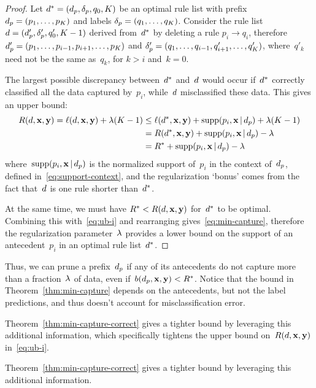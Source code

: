 \begin{arxiv}
\begin{proof}
Let ${d^* = (d_p, \delta_p, q_0, K)}$ be an optimal
rule list with prefix ${d_p = (p_1, \dots, p_K)}$
and labels ${\delta_p = (q_1, \dots, q_K)}$.
%
Consider the rule list ${{d} = (d_p', \delta_p', q_0', K-1)}$
derived from~$d^*$ by deleting a rule ${p_i \rightarrow q_i}$,
therefore ${d_p' = (p_1, \dots, p_{i-1}, p_{i+1}, \dots, p_K)}$
and ${\delta_p' = (q_1, \dots, q_{i-1}, q'_{i+1}, \dots, q'_K)}$,
where~$q'_k$ need not be the same as~$q_k$, for ${k > i}$ and~${k = 0}$.

The largest possible discrepancy between~$d^*$ and~${d}$ would occur
if~$d^*$ correctly classified all the data captured by~$p_i$,
while~${d}$ misclassified these data.
%
This gives an upper bound:
\begin{align}
\Obj(\RL, \x, \y) = \Loss(\RL, \x, \y) + \Reg (K - 1)
&\le \Loss(\OptimalRL, \x, \y) + \Supp(p_i, \x \given \Prefix) + \Reg(K - 1) \nn \\
&= \Obj(\OptimalRL, \x, \y) + \Supp(p_i, \x \given \Prefix) - \Reg \nn \\
&= \OptimalObj + \Supp(p_i, \x \given \Prefix) - \Reg
\label{eq:ub-i}
\end{align}
where~$\textnormal{supp}(p_i, \mathbf{x} \,|\, d_p)$ is the normalized support of~$p_i$
in the context of~$d_p$, defined in~\eqref{eq:support-context},
and the regularization `bonus' comes from the fact that~${d}$
is one rule shorter than~$d^*$.

At the same time, we must have ${R^* < R({d}, \mathbf{x}, \mathbf{y})}$ for~$d^*$ to be optimal.
%
Combining this with~\eqref{eq:ub-i} and rearranging gives~\eqref{eq:min-capture},
therefore the regularization parameter~${\lambda}$ provides a lower bound
on the support of an antecedent~$p_i$ in an optimal rule list~$d^*$.
\end{proof}
\end{arxiv}

Thus, we can prune a prefix~$d_p$ if any of its antecedents do not capture
more than a fraction~${\lambda}$ of data, even if~${b(d_p, \mathbf{x}, \mathbf{y}) < R^*}$.
%
Notice that the bound in Theorem~\ref{thm:min-capture}
depends on the antecedents, but not the label predictions,
and thus doesn't account for misclassification error.
%
\begin{arxiv}
Theorem~\ref{thm:min-capture-correct} gives a tighter bound
by leveraging this additional information, which specifically
tightens the upper bound on~$R({d}, \mathbf{x}, \mathbf{y})$ in~\eqref{eq:ub-i}.
\end{arxiv}
\begin{kdd}
Theorem~\ref{thm:min-capture-correct} gives a tighter bound
by leveraging this additional information.
\end{kdd}

